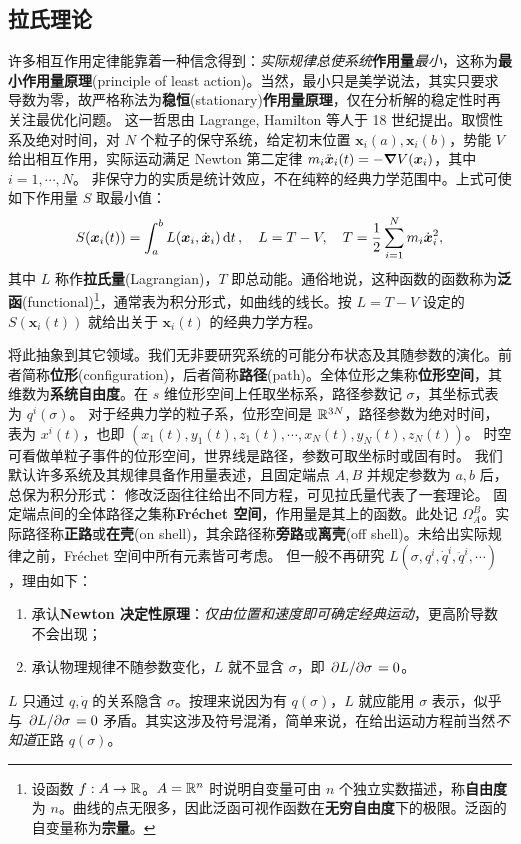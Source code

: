 \subsection{拉氏理论}

许多相互作用定律能靠着一种信念得到：\textit{实际规律总使系统}\textbf{作用量}\textit{最小}，这称为\textbf{最小作用量原理}(principle of least action)。当然，最小只是美学说法，其实只要求导数为零，故严格称法为\textbf{稳恒}(stationary)\textbf{作用量原理}，仅在分析解的稳定性时再关注最优化问题。
这一哲思由 Lagrange, Hamilton 等人于 18 世纪提出。取惯性系及绝对时间，对 $N$ 个粒子的保守系统，给定初末位置 $\bm x_i(a),\bm x_i(b)$，势能 $V$ 给出相互作用，实际运动满足 Newton 第二定律 $m_i\ddot{\vb* x}_i(t)=-\grad V(\vb* x_i)$，其中 $i=1,\cdots,N$。
非保守力的实质是统计效应，不在纯粹的经典力学范围中。上式可使如下作用量 $S$ 取最小值：
\[S(\vb* x_i(t))=\int_{a}^{b}L(\vb* x_i,\dot{\vb* x}_i)\dd{t},\quad L=T-V,\quad T=\frac{1}{2}\sum_{i=1}^N m_i \dot{\vb* x}_i^2,\]
其中 $L$ 称作\textbf{拉氏量}(Lagrangian)，$T$ 即总动能。通俗地说，这种函数的函数称为\textbf{泛函}(functional)\footnote{设函数 $f:A\to\mathbb{R}$。$A=\mathbb{R}^n$ 时说明自变量可由 $n$ 个独立实数描述，称\textbf{自由度}为 $n$。曲线的点无限多，因此泛函可视作函数在\textbf{无穷自由度}下的极限。泛函的自变量称为\textbf{宗量}。}，通常表为积分形式，如曲线的线长。按 $L=T-V$ 设定的 $S(\bm x_i(t))$ 就给出关于 $\bm x_i(t)$ 的经典力学方程。

将此抽象到其它领域。我们无非要研究系统的可能分布状态及其随参数的演化。前者简称\textbf{位形}(configuration)，后者简称\textbf{路径}(path)。全体位形之集称\textbf{位形空间}，其维数为\textbf{系统自由度}。在 $s$ 维位形空间上任取坐标系，路径参数记 $\sigma$，其坐标式表为 $q^i(\sigma)$。
对于经典力学的粒子系，位形空间是 $\mathbb{R}^{3N}$，路径参数为绝对时间，表为 $x^i(t)$，也即 $(x_1(t),y_1(t),z_1(t),\cdots,x_N(t),y_N(t),z_N(t))$。
时空可看做单粒子事件的位形空间，世界线是路径，参数可取坐标时或固有时。
我们默认许多系统及其规律具备作用量表述，且固定端点 $A,B$ 并规定参数为 $a,b$ 后，总保为积分形式：
修改泛函往往给出不同方程，可见拉氏量代表了一套理论。
固定端点间的全体路径之集称\textbf{Fréchet 空间}，作用量是其上的函数。此处记 $\Omega_A^B$。实际路径称\textbf{正路}或\textbf{在壳}(on shell)，其余路径称\textbf{旁路}或\textbf{离壳}(off shell)。未给出实际规律之前，Fréchet 空间中所有元素皆可考虑。
但一般不再研究 $L(\sigma,q^i,\dot q^i,\ddot q^i,\cdots)$，理由如下：
\begin{enumerate}
    \item 承认\textbf{Newton 决定性原理}：\textit{仅由位置和速度即可确定经典运动}，更高阶导数不会出现；
    \item 承认物理规律不随参数变化，$L$ 就不显含 $\sigma$，即 $\pdv*{L}{\sigma}=0$。
\end{enumerate}
$L$ 只通过 $q,\dot q$ 的关系隐含 $\sigma$。按理来说因为有 $q(\sigma)$，$L$ 就应能用 $\sigma$ 表示，似乎与 $\pdv*{L}{\sigma}=0$ 矛盾。其实这涉及符号混淆，简单来说，在给出运动方程前当然\textit{不知道}正路 $q(\sigma)$。

